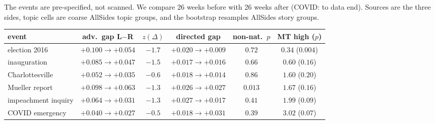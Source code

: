 \documentclass[11pt]{article}
\theoremstyle{definition}
\theoremstyle{remark}
\begin{document}
The events are pre-specified, not scanned. We compare 26 weeks before with 26 weeks after (COVID: to data end). Sources are the three sides, topic cells are coarse AllSides topic groups, and the bootstrap resamples AllSides story groups.
\begin{center}\small
\begin{tabular}{lccccc}
\toprule
event & adv.\ gap L$-$R & $z(\Delta)$ & directed gap & non-nat.\ $p$ & MT high ($p$)\\
\midrule
election 2016 & $+0.100\to+0.054$ & $-1.7$ & $+0.020\to+0.009$ & $0.72$ & $0.34$ ($0.004$)\\
inauguration & $+0.085\to+0.047$ & $-1.5$ & $+0.017\to+0.016$ & $0.66$ & $0.60$ ($0.16$)\\
Charlottesville & $+0.052\to+0.035$ & $-0.6$ & $+0.018\to+0.014$ & $0.86$ & $1.60$ ($0.20$)\\
Mueller report & $+0.098\to+0.063$ & $-1.3$ & $+0.026\to+0.027$ & $\mathbf{0.013}$ & $1.67$ ($0.16$)\\
impeachment inquiry & $+0.064\to+0.031$ & $-1.3$ & $+0.027\to+0.017$ & $0.41$ & $1.99$ ($0.09$)\\
COVID emergency & $+0.040\to+0.027$ & $-0.5$ & $+0.018\to+0.031$ & $0.39$ & $3.02$ ($0.07$)\\
\bottomrule
\end{tabular}
\end{center}
\end{document}
